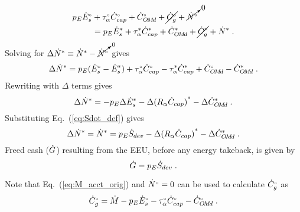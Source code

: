 \begin{landscape}
{\begin{align}
  p_E {}{\dot{E}}^{\scriptscriptstyle \circ}_s &+ {}{\tau}^{\scriptscriptstyle \circ}_\alpha {}{\dot{C}}^{\scriptscriptstyle \circ}_{cap} + {}{\dot{C}}^{\scriptscriptstyle \circ}_{O\!M\!d} + \cancel{{}{\dot{C}}^{\scriptscriptstyle \circ}_g} + \cancelto{0}{{}{\dot{N}}^{\scriptscriptstyle \circ}} \nonumber \\
                   &= p_E {\dot{E}}^*_s + {\tau}^*_\alpha {\dot{C}}^*_{cap} + {\dot{C}}^*_{O\!M\!d} + \cancel{{\dot{C}}^*_g}  + {\dot{N}}^* \; .
\end{align}
%
Solving for $\Delta {\dot{N}}^* \equiv {\dot{N}}^* - \cancelto{0}{{}{\dot{N}}^{\scriptscriptstyle \circ}}$ gives 
%
\begin{equation}
  \Delta {\dot{N}}^* = p_E({}{\dot{E}}^{\scriptscriptstyle \circ}_s - {\dot{E}}^*_s) 
                      + {}{\tau}^{\scriptscriptstyle \circ}_\alpha {}{\dot{C}}^{\scriptscriptstyle \circ}_{cap} - {\tau}^*_\alpha {\dot{C}}^*_{cap}
                      + {}{\dot{C}}^{\scriptscriptstyle \circ}_{O\!M\!d} - {\dot{C}}^*_{O\!M\!d} \; .
\end{equation}
%
Rewriting with $\Delta$ terms gives
%
\begin{equation}
  \Delta {\dot{N}}^* = - p_E \Delta {\dot{E}}^*_s - \Delta {(R_\alpha \dot{C}_{cap})}^* - \Delta {\dot{C}}^*_{O\!M\!d} \; .
\end{equation}
%
Substituting Eq.~(\ref{eq:Sdot_def}) gives
%
\begin{equation} \label{eq:N_dot_star_empl}
  \Delta {\dot{N}}^* = {\dot{N}}^* = p_E \dot{S}_{dev} - \Delta {(R_\alpha \dot{C}_{cap})}^* - \Delta {\dot{C}}^*_{O\!M\!d} \; .
\end{equation}
%
Freed cash ($\dot{G}$) resulting from the EEU, 
before any energy takeback, is given by 
%
\begin{equation} \label{eq:G_dot}
  \dot{G} = p_E \dot{S}_{dev} \; .
\end{equation}

Note that Eq.~(\ref{eq:M_acct_orig}) and ${}{\dot{N}}^{\scriptscriptstyle \circ} = 0$ can be used to calculate ${}{\dot{C}}^{\scriptscriptstyle \circ}_g$ as
%
\begin{equation} \label{eq:C_dot_o}
  {}{\dot{C}}^{\scriptscriptstyle \circ}_g = \dot{M} - p_E {}{\dot{E}}^{\scriptscriptstyle \circ}_s - {}{\tau}^{\scriptscriptstyle \circ}_\alpha {}{\dot{C}}^{\scriptscriptstyle \circ}_{cap} - {}{\dot{C}}^{\scriptscriptstyle \circ}_{O\!M\!d} \; .
\end{equation}
%

}
\end{landscape}

\restoregeometry

